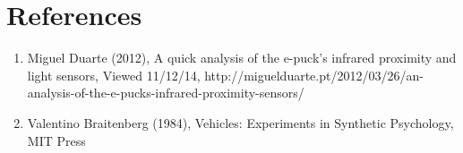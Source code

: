 \documentclass[11pt]{article}
\begin{document}
\section*{References}

\begin{enumerate}
\item{Miguel Duarte (2012), A quick analysis of the e-puck’s infrared proximity and light sensors, Viewed 11/12/14, http://miguelduarte.pt/2012/03/26/an-analysis-of-the-e-pucks-infrared-proximity-sensors/}
\item{Valentino Braitenberg (1984), Vehicles: Experiments in Synthetic Psychology, MIT Press}
\end{enumerate}
\end{document}

